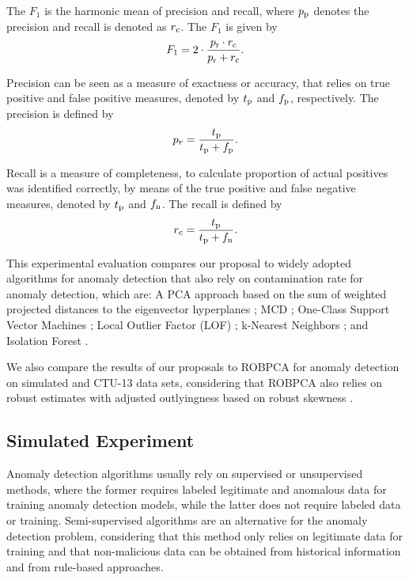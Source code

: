 The $F_1$ is the harmonic mean of precision and recall, where $p_{\rm p}$ denotes the precision and recall is denoted as $r_{\rm c}$. The $F_1$ is given by
\begin{equation}\label{eq:4.15}
	F_1 = 2 \cdot \frac{p_{\rm r} \cdot r_{\rm c}}{p_{\rm r} + r_{\rm c}}.
\end{equation}

Precision can be seen as a measure of exactness or accuracy, that relies on true positive and false positive measures, denoted by $t_{\rm p}$ and $f_{\rm p}$, respectively. The precision is defined by 
\begin{equation}\label{eq:4.16}
	p_r = \frac{t_{\rm p}}{t_{\rm p} + f_{\rm p}}.
\end{equation}

Recall is a measure of completeness, to calculate proportion of actual positives was identified correctly, by means of the true positive and false negative measures, denoted by $t_{\rm p}$ and $f_{\rm n}$. The recall is defined by 
\begin{equation}\label{eq:4.17}
	r_c = \frac{t_{\rm p}}{t_{\rm p} + f_{\rm n}}.
\end{equation}

This experimental evaluation compares our proposal to widely adopted algorithms for anomaly detection that also rely on contamination rate for anomaly detection, which are: A PCA approach based on the sum of weighted projected distances to the eigenvector hyperplanes \cite{shyu2003novel}; MCD \cite{rousseeuw1984mcd,rousseeuw1999fastmcd}; One-Class Support Vector Machines \cite{scholkopf2001estimating}; Local Outlier Factor (LOF) \cite{breunig2000lof}; k-Nearest Neighbors \cite{angiulli2002fast}; and Isolation Forest \cite{liu2008isolation}.

We also compare the results of our proposals to ROBPCA for anomaly detection on simulated and CTU-13 data sets, considering that ROBPCA also relies on robust estimates with adjusted outlyingness based on robust skewness \cite{hubert2009robustskewed}.

\subsection{Simulated Experiment}
\label{sec:3_SimulatedScenario}

Anomaly detection algorithms usually rely on supervised or unsupervised methods, where the former requires labeled legitimate and anomalous data for training anomaly detection models, while the latter does not require labeled data or training. Semi-supervised algorithms are an alternative for the anomaly detection problem, considering that this method only relies on legitimate data for training and that non-malicious data can be obtained from historical information and from rule-based approaches. 

